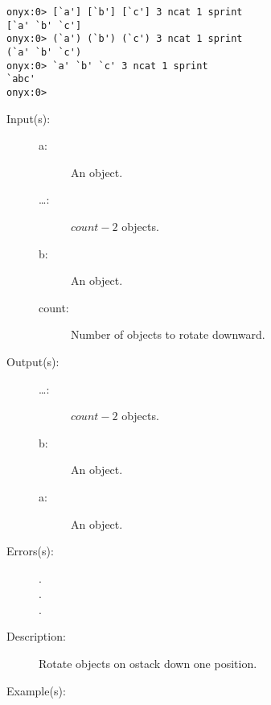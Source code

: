 \begin{description}
\begin{description}
\begin{verbatim}
onyx:0> [`a'] [`b'] [`c'] 3 ncat 1 sprint
[`a' `b' `c']
onyx:0> (`a') (`b') (`c') 3 ncat 1 sprint
(`a' `b' `c')
onyx:0> `a' `b' `c' 3 ncat 1 sprint
`abc'
onyx:0>
		\end{verbatim}
	\end{description}
\label{systemdict:ndn}
\item[{\onyxop{a \dots b count}{ndn}{\dots b a}}: ]
	\begin{description}\item[]
	\item[Input(s): ]
		\begin{description}\item[]
		\item[a: ]
			An object.
		\item[\dots: ]
			$count - 2$ objects.
		\item[b: ]
			An object.
		\item[count: ]
			Number of objects to rotate downward.
		\end{description}
	\item[Output(s): ]
		\begin{description}\item[]
		\item[\dots: ]
			$count - 2$ objects.
		\item[b: ]
			An object.
		\item[a: ]
			An object.
		\end{description}
	\item[Errors(s): ]
		\begin{description}\item[]
		\item[.]
		\item[.]
		\item[.]
		\end{description}
	\item[Description: ]
		Rotate  objects on ostack down one position.
	\item[Example(s): ]\begin{verbatim}


\end{verbatim}
\end{description}
\end{description}
